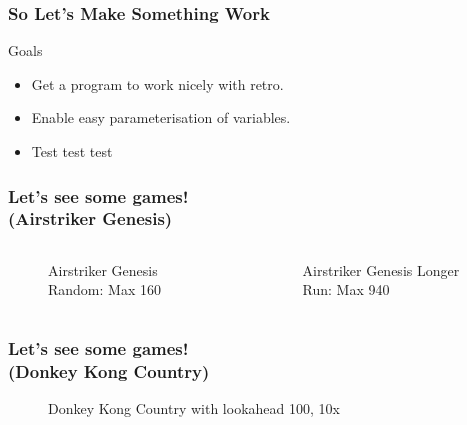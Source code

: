 \documentclass[pdf,11pt]{beamer}
\begin{document}
\begin{frame}
\frametitle{So Let's Make Something Work}
        \centering \Huge{Goals}\normalsize
        \begin{itemize}
        \item Get a program to work nicely with retro.
        \pause
        \item Enable easy parameterisation of variables.
        \pause
        \item Test test test
        \end{itemize}
\end{frame}


\begin{frame}
\frametitle{Let's see some games! \\\vspace{-15pt} \large{(Airstriker Genesis)}}
        \begin{columns}
        
        \begin{column}{0.49\paperwidth}
        \begin{figure}
        \caption{Airstriker Genesis Random: Max 160}
        \end{figure}
        \end{column}
        
        \begin{column}{0.49\paperwidth}
        \begin{figure}
        \caption{Airstriker Genesis Longer Run: Max 940}
        \end{figure}
        \end{column}
        
        \end{columns}
\end{frame}

\begin{frame}
\frametitle{Let's see some games!\\ \vspace{-15pt}\large{(Donkey Kong Country)}}

\begin{figure}
\caption{Donkey Kong Country with lookahead 100, 10x}
\end{figure}
\end{frame}
\end{document}
